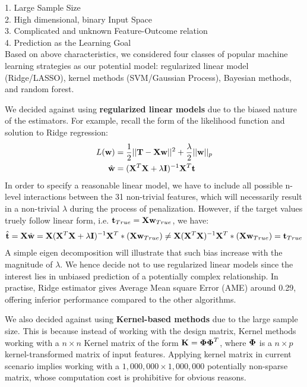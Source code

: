 \documentclass[11pt]{article}
\theoremstyle{definition}
\begin{document}
1. Large Sample Size\\
2. High dimensional, binary Input Space\\
3. Complicated and unknown Feature-Outcome relation\\
4. Prediction as the Learning Goal\\

Based on above characteristics, we considered four classes of popular machine learning strategies as our potential model: regularized linear model (Ridge/LASSO), kernel methods (SVM/Gaussian Process), Bayesian methods, and random forest.

We decided against using \textbf{regularized linear models} due to the biased nature of the estimators. For example, recall the form of the likelihood function and solution to Ridge regression:
\begin{align*}
L({\bf w}) &= \frac{1}{2} || {\bf T} - {\bf X}{\bf w}||^2 + \frac{\lambda}{2}||{\bf w}||_p\\
\hat{{\bf w}} &= ({\bf X}^T{\bf X} + \lambda {\bf I})^{-1}{\bf X}^T{\bf t}
\end{align*}
In order to specify a reasonable linear model, we have to include all possible n-level interactions between the 31 non-trivial features, which will necessarily result in a non-trivial $\lambda$ during the process of penalization. However, if the target values truely follow linear form, i.e. ${\bf t}_{True} = {\bf X} {\bf w}_{True}$, we have:
\begin{align*}
\hat{{\bf t}} = {\bf X}\hat{{\bf w}} =  {\bf X}({\bf X}^T{\bf X} + \lambda {\bf I})^{-1}{\bf X}^T * ({\bf X} {\bf w}_{True}) \neq  {\bf X}({\bf X}^T{\bf X})^{-1}{\bf X}^T * ({\bf X} {\bf w}_{True}) = {\bf t}_{True} 
\end{align*}
A simple eigen decomposition will illustrate that such bias increase with the magnitude of $\lambda$. We hence decide not to use regularized linear models since the interest lies in unbiased prediction of a potentially complex relationship. In practise, Ridge estimator gives Average Mean square Error (AME) around 0.29, offering inferior performance compared to the other algorithms.

We also decided against using \textbf{Kernel-based methods} due to the large sample size. This is because instead of working with the design matrix, Kernel methods working with a $n \times n$ Kernel matrix of the form ${\bf K} = \boldsymbol{\Phi} \boldsymbol{\Phi}^T$, where $\boldsymbol{\Phi}$ is a $n \times p$ kernel-transformed matrix of input features. Applying kernel matrix in current scenario implies working with a $1,000,000 \times 1,000,000$ potentially non-sparse matrix, whose computation cost is prohibitive for obvious reasons. 
\end{document}
